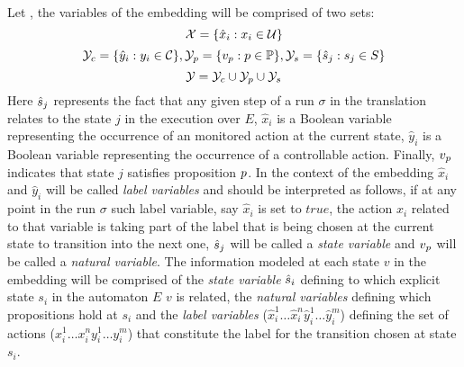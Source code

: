 %
Let \cltsDef, the variables of the embedding will be comprised of two sets:
\[{\mathcal{X}} = \{\hat{x}_i : x_i \in \mathcal{U} \}\]
\[{\mathcal{Y}}_c = \{\hat{y}_i : y_i \in \mathcal{C} \}, {\mathcal{Y}}_p = \{v_{p} : p \in \mathbb{P}\}, {\mathcal{Y}}_s = \{\hat{s}_{j} : s_j \in S \}\]
\[{\mathcal{Y}} = {\mathcal{Y}}_c \cup {\ensuremath{\mathcal{Y}}}_p \cup {\ensuremath{\mathcal{Y}}}_s \]
Here $\hat{s}_{j}$ represents the fact that any given step of a run $\sigma$ in the translation relates to the state $j$ in the execution \execution over $E$, $\hat{x}_i$ is a Boolean variable representing the occurrence of an monitored action at the current state, $\hat{y}_i$ is a Boolean variable representing the occurrence of a controllable action. Finally, $v_{p}$ indicates that state $j$ satisfies proposition $p$. In the context of the embedding $\hat{x}_i$ and $\hat{y}_i$ will be called \emph{label variables} and should be interpreted as follows, if at any point in the run $\sigma$ such label variable, say $\hat{x}_i$ is set to $true$, the action $x_i$ related to that variable is taking part of the label that is being chosen at the current state to transition into the next one, $\hat{s}_{j}$ will be called a \emph{state variable} and $v_{p}$ will be called a \emph{natural variable}. The information modeled at each state $v$ in the embedding \fdsEmbedding will be comprised of the \emph{state variable} $\hat{s}_{i}$ defining to which explicit state $s_i$ in the automaton $E$ $v$ is related, the \emph{natural variables} defining which propositions hold at $s_i$ and the \emph{label variables} ($\hat{x}_i^1\ldots \hat{x}_i^n \hat{y}_i^1\ldots \hat{y}_i^m$) defining the set of actions ($x_i^1\ldots x_i^n y_i^1\ldots y_i^m$) that constitute the label for the transition chosen at state $s_i$.

